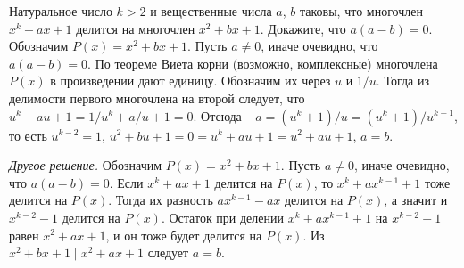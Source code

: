 \problem
Натуральное число $k > 2$ и вещественные числа $a$, $b$ таковы, что
многочлен $x^k + a x + 1$ делится на многочлен $x^2 + b x + 1$.
Докажите, что $a (a - b) = 0$.
\solution
Обозначим $P(x) = x^2 + b x + 1$.
Пусть $a \neq 0$, иначе очевидно, что $a (a - b) = 0$.
По теореме Виета корни (возможно, комплексные) многочлена $P(x)$ в произведении
дают единицу.
Обозначим их через $u$ и $1 / u$.
Тогда из делимости первого многочлена на второй следует, что
$u^k + a u + 1 = 1 / u^k + a / u + 1 = 0$.
Отсюда
$-a = (u^k + 1) / u = (u^k + 1) / u^{k - 1}$,
то есть $u^{k - 2} = 1$,
$u^2 + b u + 1 = 0 = u^k + a u + 1 = u^2 + a u + 1$, $a = b$.
\par
\emph{Другое решение.}
Обозначим $P(x) = x^2 + b x + 1$.
Пусть $a \neq 0$, иначе очевидно, что $a (a - b) = 0$.
Если $x^k + a x + 1$ делится на $P(x)$, то $x^k + a x^{k - 1} + 1$ тоже делится
на $P(x)$.
Тогда их разность $a x^{k - 1} - a x$ делится на $P(x)$, а значит и
$x^{k - 2} - 1$ делится на $P(x)$.
Остаток при делении $x^k + a x^{k - 1} + 1$ на $x^{k - 2} - 1$ равен
$x^2 + a x + 1$, и он тоже будет делится на $P(x)$.
Из $x^2 + b x + 1 \mid x^2 + a x + 1$ следует $a = b$.
\endproblem
